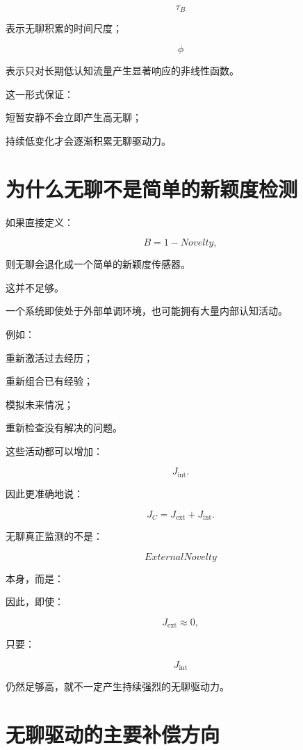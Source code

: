 \[
\tau_B
\]

表示无聊积累的时间尺度；

\[
\phi
\]

表示只对长期低认知流量产生显著响应的非线性函数。

这一形式保证：

短暂安静不会立即产生高无聊；

持续低变化才会逐渐积累无聊驱动力。

\section{为什么无聊不是简单的新颖度检测}

如果直接定义：

\[
B=1-Novelty,
\]

则无聊会退化成一个简单的新颖度传感器。

这并不足够。

一个系统即使处于外部单调环境，也可能拥有大量内部认知活动。

例如：

重新激活过去经历；

重新组合已有经验；

模拟未来情况；

重新检查没有解决的问题。

这些活动都可以增加：

\[
J_{\mathrm{int}}.
\]

因此更准确地说：

\[
\boxed{
J_C
=
J_{\mathrm{ext}}
+
J_{\mathrm{int}}.
}
\]

无聊真正监测的不是：

\[
ExternalNovelty
\]

本身，而是：

\begin{statementbox}
\centering
{}
\end{statementbox}

因此，即使：

\[
J_{\mathrm{ext}}\approx0,
\]

只要：

\[
J_{\mathrm{int}}
\]

仍然足够高，就不一定产生持续强烈的无聊驱动力。

\section{无聊驱动的主要补偿方向}

